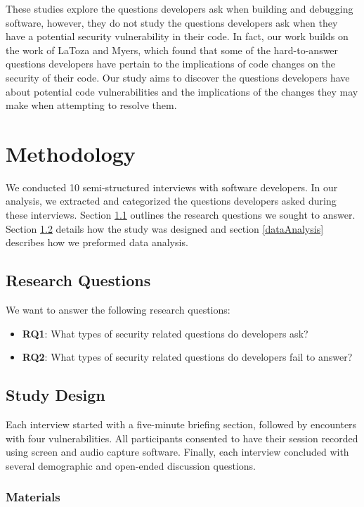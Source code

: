 \documentclass[conference]{IEEEtran}
\begin{document}
These studies explore the questions developers ask when building and debugging software, however, they do not study the questions developers ask when they have a potential security vulnerability in their code. 
In fact, our work builds on the work of LaToza and Myers, which found that some of the hard-to-answer questions developers have pertain to the implications of code changes on the security of their code. 
Our study aims to discover the questions developers have about potential code vulnerabilities and the implications of the changes they may make when attempting to resolve them. 

\section{Methodology}
\label{sec:meth}
We conducted 10 semi-structured interviews with software developers. In our analysis, we extracted and categorized the questions developers asked during these interviews. Section \ref{rqs} outlines the research questions we sought to answer. Section \ref{studyDesign} details how the study was designed and section \ref{dataAnalysis} describes how we preformed data analysis.


\subsection{Research Questions}
\label{rqs}
We want to answer the following research questions:
\begin{itemize}
\item \textbf{RQ1}: What types of security related questions do developers ask?
\item \textbf{RQ2}: What types of security related questions do developers fail to answer?
\end{itemize}

\subsection{Study Design}
\label{studyDesign}
Each interview started with a five-minute briefing section, followed by encounters with four vulnerabilities.
All participants consented to have their session recorded using screen and audio capture software.
Finally, each interview concluded with several demographic and open-ended discussion questions.


\subsubsection{Materials}
\end{document}
